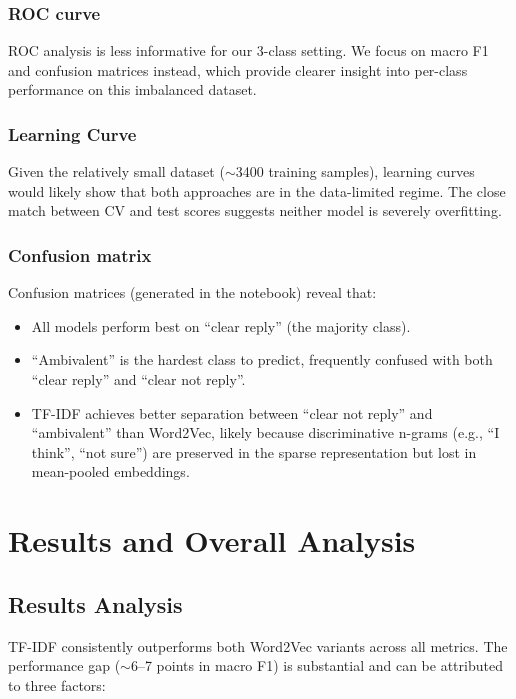 \documentclass[12pt]{fphw}
\begin{document}
\subsubsection{ROC curve}

ROC analysis is less informative for our 3-class setting. We focus on macro F1 and confusion matrices instead, which provide clearer insight into per-class performance on this imbalanced dataset.

\subsubsection{Learning Curve}

Given the relatively small dataset ($\sim$3400 training samples), learning curves would likely show that both approaches are in the data-limited regime. The close match between CV and test scores suggests neither model is severely overfitting.

\subsubsection{Confusion matrix}

Confusion matrices (generated in the notebook) reveal that:
\begin{itemize}
	\item All models perform best on ``clear reply'' (the majority class).
	\item ``Ambivalent'' is the hardest class to predict, frequently confused with both ``clear reply'' and ``clear not reply''.
	\item TF-IDF achieves better separation between ``clear not reply'' and ``ambivalent'' than Word2Vec, likely because discriminative n-grams (e.g., ``I think'', ``not sure'') are preserved in the sparse representation but lost in mean-pooled embeddings.
\end{itemize}


\section{Results and Overall Analysis}

\subsection{Results Analysis}

TF-IDF consistently outperforms both Word2Vec variants across all metrics. The performance gap ($\sim$6--7 points in macro F1) is substantial and can be attributed to three factors:
\end{document}
